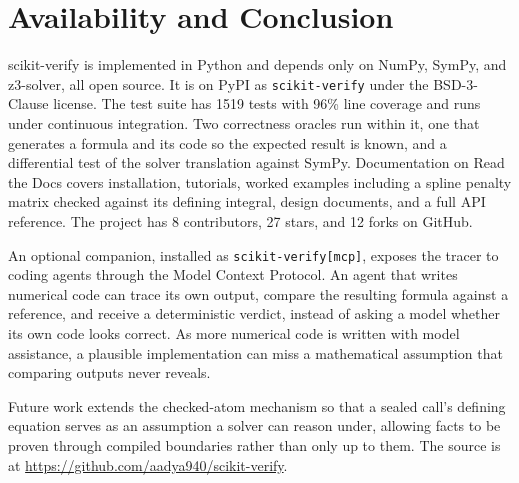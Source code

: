 \documentclass[twoside,11pt]{article}
\begin{document}
\section{Availability and Conclusion}

scikit-verify is implemented in Python and depends only on NumPy,
SymPy, and z3-solver, all open source. It is on PyPI as
\verb|scikit-verify| under the BSD-3-Clause license. The test suite has
1519 tests with 96\% line coverage and runs under continuous
integration. Two correctness oracles run within it, one that generates
a formula and its code so the expected result is known, and a
differential test of the solver translation against SymPy.
Documentation on Read the Docs covers installation, tutorials, worked
examples including a spline penalty matrix checked against its defining
integral, design documents, and a full API reference. The project has
8 contributors, 27 stars, and 12 forks on GitHub.

An optional companion, installed as \verb|scikit-verify[mcp]|, exposes
the tracer to coding agents through the Model Context Protocol. An agent
that writes numerical code can trace its own output, compare the
resulting formula against a reference, and receive a deterministic
verdict, instead of asking a model whether its own code looks correct.
As more numerical code is written with model assistance, a plausible
implementation can miss a mathematical assumption that comparing
outputs never reveals.

Future work extends the checked-atom mechanism so that a sealed call's
defining equation serves as an assumption a solver can reason under,
allowing facts to be proven through compiled boundaries rather than only
up to them. The source is at
\url{https://github.com/aadya940/scikit-verify}.


\end{document}
